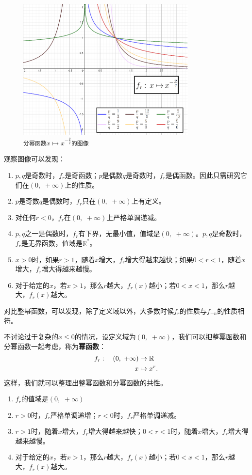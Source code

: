 \documentclass[12pt,UTF8]{ctexbook}
\begin{document}
\begin{figure}[h]
    \vspace{4pt}
    \centering
    \includegraphics[width=0.8\textwidth]{分幂函数3.png}
    \caption*{\texttt{分幂函数}$x\mapsto x^{-\frac{p}{q}}$\texttt{的图像}}
\end{figure}

观察图像可以发现：
\begin{enumerate}
    \item $p, q$是奇数时，$f_r$是奇函数；$p$是偶数$q$是奇数时，$f_r$是偶函数。因此只需研究它们在$(0, \,\,  +\infty)$上的性质。
    \item $p$是奇数$q$是偶数时，$f_r$只在$(0, \,\, +\infty)$上有定义。
    \item 对任何$r < 0$，$f_r$在$(0, \,\, +\infty)$上严格单调递减。
    \item $p, q$之一是偶数时，$f_r$有下界，无最小值，值域是$(0, \,\, +\infty)$。$p, q$是奇数时，$f_r$是无界函数，值域是$\mathbb{R}^*$。
    \item $x>0$时，如果$r>1$，随着$x$增大，$f_r$增大得越来越快；如果$0 < r < 1$，随着$x$增大，$f_r$增大得越来越慢。
    \item 对于给定的$x$，若$x>1$，那么$r$越大，$f_r(x)$越小；若$0 < x<1$，那么$r$越大，$f_r(x)$越大。
\end{enumerate}
对比整幂函数，可以发现，除了定义域以外，大多数时候$f_r$的性质与$f_{-n}$的性质相符。

不讨论过于复杂的$x\leqslant 0$的情况，设定义域为$(0, \,\, +\infty)$，我们可以把整幂函数和分幂函数一起考虑，称为\textbf{幂函数}：
\begin{align}
    f_r :\quad (0, \,\, +\infty) &\rightarrow \mathbb{R} \notag \\
    x &\mapsto x^r. \notag
\end{align}
这样，我们就可以整理出整幂函数和分幂函数的共性。
\begin{enumerate}
    \item $f_r$的值域是$(0, \,\, +\infty)$
    \item $r > 0$时，$f_r$严格单调递增；$r < 0$时，$f_r$严格单调递减。
    \item $r>1$时，随着$x$增大，$f_r$增大得越来越快；$0 < r < 1$时，随着$x$增大，$f_r$增大得越来越慢。
    \item 对于给定的$x$，若$x>1$，那么$r$越大，$f_r(x)$越小；若$0 < x<1$，那么$r$越大，$f_r(x)$越大。
\end{enumerate}
\end{document}
